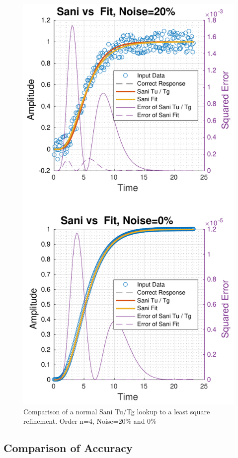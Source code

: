 \begin{figure}
    \includegraphics[width=\linewidth]{images/sani_vs_fit}
    \caption{Comparison of a normal Sani Tu/Tg lookup to a least square refinement. Order n=4, Noise=20\% and 0\%}
    \label{fig:sani_vs_fit}
\end{figure}


\subsection{Comparison of Accuracy}

